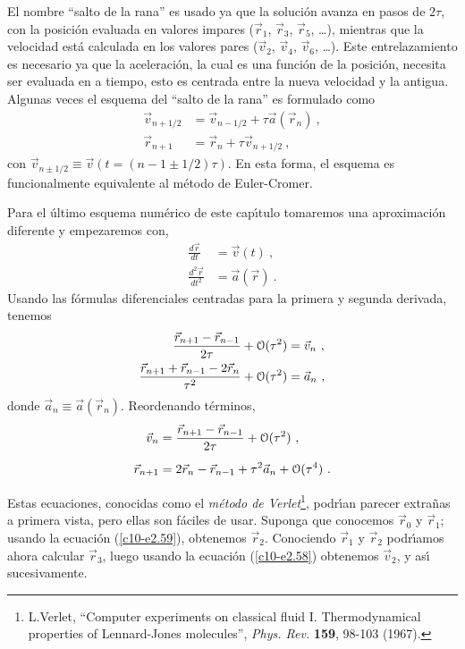 El nombre ``salto de la rana'' es usado ya que la soluci{\'o}n avanza en
pasos de $2\tau$, con la posici{\'o}n evaluada en valores impares ($\vec
r_1$, $\vec r_3$, $\vec r_5$, \ldots), mientras que la velocidad est{\'a}
calculada en los valores pares ($\vec v_2$, $\vec v_4$, $\vec v_6$,
\ldots). Este entrelazamiento es necesario ya que la aceleraci{\'o}n, la cual
es una funci{\'o}n de la posici{\'o}n, necesita ser evaluada en a tiempo, esto
es centrada entre la nueva velocidad y la antigua. Algunas veces el
esquema del ``salto de la rana'' es formulado como
\begin{align}
\label{c10-e2.52}
\vec v_{n+1/2}&= \vec v_{n-1/2}+\tau\vec a(\vec r_n)\ ,\\
\label{c10-e2.53}
\vec r_{n+1} &=\vec r_n + \tau\vec v_{n+1/2}\ ,
\end{align}
con $\vec v_{n\pm1/2}\equiv \vec v(t=(n-1\pm1/2)\tau)$. En esta forma, el
esquema es funcionalmente equivalente al m{\'e}todo de Euler-Cromer. 

Para el {\'u}ltimo esquema num{\'e}rico de este cap{\'\i}tulo tomaremos una
aproximaci{\'o}n diferente y empezaremos con,
\begin{align}
\label{c10-e2.54}
\frac{d\vec r}{dt}&=\vec v(t)\ ,\\
\label{c10-e2.55}
\frac{d^2\vec r}{dt^2}&=\vec a(\vec r)\ .
\end{align}
Usando las f{\'o}rmulas diferenciales centradas para la primera y segunda
derivada, tenemos 
\begin{align}
\label{c10-e2.56}
\frac{\vec r_{n+1}-\vec r_{n-1}}{2\tau}+ \EuScript{O}(\tau^2)&=\vec v_n\ ,\\
\label{c10-e2.57}
\frac{\vec r_{n+1}+\vec r_{n-1}-2\vec r_n}{\tau^2}+ \EuScript{O}(\tau^2)&=\vec a_n\ ,
\end{align}
donde $\vec a_n\equiv \vec a (\vec r_n)$. Reordenando t{\'e}rminos, 
\begin{align}
\label{c10-e2.58}
\vec v_n &= \frac{\vec r_{n+1}-\vec r_{n-1}}{2\tau}+ \EuScript{O}(\tau^2)\ ,\\[2mm]
\label{c10-e2.59}
\vec r_{n+1}&=2\vec r_{n}-\vec r_{n-1}+ \tau^2\vec a_n +\EuScript{O}(\tau^4)\ .
\end{align}

Estas ecuaciones, conocidas como el {\em m{\'e}todo de
  Verlet}\footnote{L.Verlet, ``Computer experiments on classical fluid
  I. Thermodynamical properties of Lennard-Jones molecules'', {\em
    Phys. Rev.} {\bf 159}, 98-103 (1967).}, podr{\'\i}an parecer extra{\~n}as a
primera vista, pero ellas son f{\'a}ciles de usar. Suponga que conocemos
$\vec r_0$ y $\vec r_1$; usando la ecuaci{\'o}n (\ref{c10-e2.59}),
obtenemos $\vec r_2$. Conociendo $\vec r_1$ y $\vec r_2$ podr{\'\i}amos
ahora calcular $\vec r_3$, luego usando la ecuaci{\'o}n (\ref{c10-e2.58})
obtenemos $\vec v_2$, y as{\'\i} sucesivamente.

